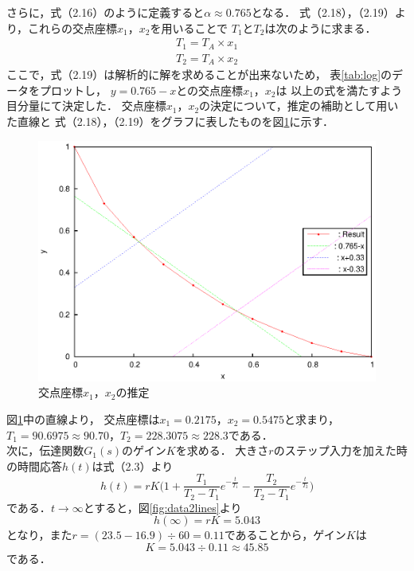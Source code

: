 \documentclass[11pt,a4paper]{jsarticle}
\begin{document}
    さらに，式（2.16）のように定義すると$\alpha \approx 0.765$となる．
    式（2.18），（2.19）より，これらの交点座標$x_1$，$x_2$を用いることで
    $T_1$と$T_2$は次のように求まる．
    \begin{eqnarray}
      T_1 = T_A \times x_1 \\
      T_2 = T_A \times x_2 
    \end{eqnarray}
    ここで，式（2.19）は解析的に解を求めることが出来ないため，
    表\ref{tab:log}のデータをプロットし，
    $y = 0.765 - x$との交点座標$x_1$，$x_2$は
    以上の式を満たすよう目分量にて決定した．
    交点座標$x_1$，$x_2$の決定について，推定の補助として用いた直線と
    式（2.18），（2.19）をグラフに表したものを図\ref{fig:datalog}に示す．

    \begin{figure}[b]
      \begin{center}
        \includegraphics[width=0.9\hsize]{./fig/datalog.eps}
      \end{center}
      \caption{交点座標$x_1$，$x_2$の推定}
      \label{fig:datalog}
    \end{figure}

    図\ref{fig:datalog}中の直線より，
    交点座標は$x_1 = 0.2175$，$x_2 = 0.5475$と求まり，
    $T_1 = 90.6975 \approx 90.70$，$T_2 = 228.3075 \approx 228.3$である．\\

    次に，伝達関数$G_1(s)$のゲイン$K$を求める．
    大きさ$r$のステップ入力を加えた時の時間応答$h(t)$は式（2.3）より
    \begin{equation}
      h(t) = r K \biggl( 1 + \frac{T_1}{T_2 - T_1} e^{- \frac{t}{T_1}}
                           - \frac{T_2}{T_2 - T_1} e^{- \frac{t}{T_2}} \biggr)
    \end{equation}
    である．$t \rightarrow \infty$とすると，図\ref{fig:data2lines}より
    \begin{equation}
      h(\infty) = r K = 5.043
    \end{equation}
    となり，また$r = (23.5 -16.9) \div 60 = 0.11$であることから，ゲイン$K$は
    \begin{equation}
      K = 5.043 \div 0.11 \approx 45.85
    \end{equation}
    である．\\
    
\end{document}
